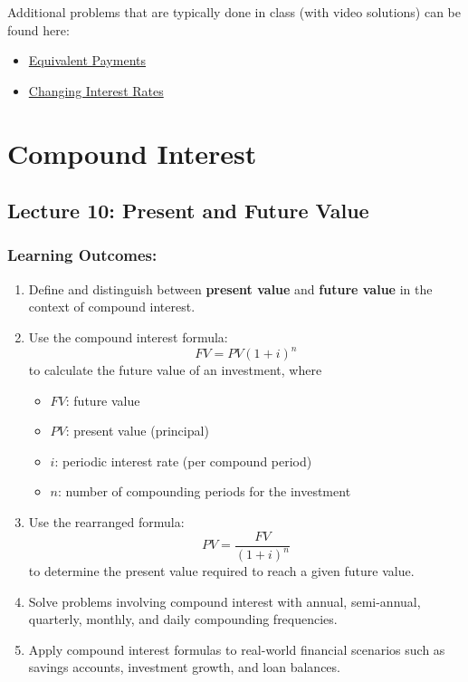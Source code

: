 \documentclass[
]{book}
\providecommand{\tightlist}{%
  \setlength{\itemsep}{0pt}\setlength{\parskip}{0pt}}
\begin{document}
Additional problems that are typically done in class (with video solutions) can be found here:

\begin{itemize}
\item
  \href{https://theelementsmath.github.io/M114/simple-interest.html\#equivalent-payments}{Equivalent Payments}
\item
  \href{https://theelementsmath.github.io/M114/simple-interest.html\#changing-interest-rates}{Changing Interest Rates}
\end{itemize}

\chapter{Compound Interest}\label{compound-interest}

\section*{Lecture 10: Present and Future Value}\label{lecture-10-present-and-future-value}

\subsection*{Learning Outcomes:}\label{learning-outcomes-9}

\begin{enumerate}
\def\labelenumi{\arabic{enumi}.}
\tightlist
\item
  Define and distinguish between \textbf{present value} and \textbf{future value} in the context of compound interest.
\item
  Use the compound interest formula:
  \[
   FV = PV\left(1 + i\right)^{n}
   \]
  to calculate the future value of an investment, where

  \begin{itemize}
  \tightlist
  \item
    \(FV\): future value
  \item
    \(PV\): present value (principal)
  \item
    \(i\): periodic interest rate (per compound period)
  \item
    \(n\): number of compounding periods for the investment
  \end{itemize}
\item
  Use the rearranged formula:
  \[
   PV = \dfrac{FV}{\left(1 + i\right)^{n}}
   \]
  to determine the present value required to reach a given future value.
\item
  Solve problems involving compound interest with annual, semi-annual, quarterly, monthly, and daily compounding frequencies.
\item
  Apply compound interest formulas to real-world financial scenarios such as savings accounts, investment growth, and loan balances.
\end{enumerate}
\end{document}
